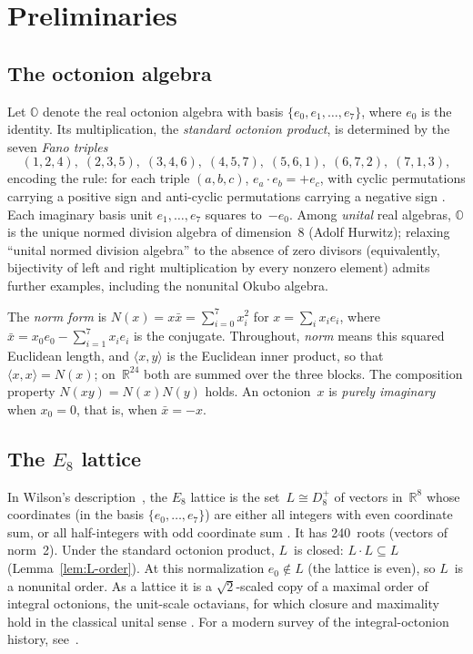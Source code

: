 \documentclass[twoside,english]{paper}
\numberwithin{equation}{section}
\numberwithin{figure}{section}
\theoremstyle{definition}
\theoremstyle{remark}
\newcommand{\OO}{\mathbb{O}}          %
\newcommand{\RR}{\mathbb{R}}
\newcommand{\Nrm}{N}                  %
\begin{document}
\section{Preliminaries}\label{sec:prelim}

\subsection{The octonion algebra}

Let $\OO$ denote the real octonion algebra with basis
$\{e_0, e_1, \ldots, e_7\}$, where $e_0$ is the identity.
Its multiplication, the \emph{standard octonion product}, is
determined by the seven \emph{Fano triples}
\begin{equation}\label{eq:fano}
  (1,2,4),\; (2,3,5),\; (3,4,6),\; (4,5,7),\; (5,6,1),\;
  (6,7,2),\; (7,1,3),
\end{equation}
encoding the rule: for each triple $(a,b,c)$,
$e_a \cdot e_b = +e_c$, with cyclic permutations carrying a positive
sign and anti-cyclic permutations carrying a negative sign
\cite{Baez2002}.  Each imaginary basis unit $e_1, \ldots, e_7$ squares
to~$-e_0$.  Among
\emph{unital} real algebras, $\OO$ is the unique normed division
algebra of dimension~8 (Adolf Hurwitz); relaxing ``unital normed division
algebra'' to the absence of zero divisors (equivalently, bijectivity of left and
right multiplication by every nonzero element) admits further
examples, including the nonunital Okubo algebra.

The \emph{norm form} is $\Nrm(x) = x \bar{x} = \sum_{i=0}^7 x_i^2$
for $x = \sum_i x_i e_i$, where $\bar{x} = x_0 e_0 - \sum_{i=1}^7
x_i e_i$ is the conjugate.  Throughout, \emph{norm} means this
squared Euclidean length, and $\langle x, y\rangle$ is the Euclidean inner
product, so that $\langle x, x\rangle = \Nrm(x)$; on~$\RR^{24}$ both are
summed over the three blocks.  The composition property
$\Nrm(xy) = \Nrm(x)\Nrm(y)$ holds.  An octonion~$x$ is \emph{purely
imaginary} when $x_0 = 0$, that is, when $\bar x = -x$.

\subsection{The \texorpdfstring{$E_8$}{E8} lattice}

In Wilson's description~\cite{Wilson2009}, the $E_8$ lattice is
the set~$L \cong D_8^+$ of vectors in~$\RR^8$ whose coordinates (in the
basis $\{e_0, \ldots, e_7\}$) are either all integers with even
coordinate sum, or all half-integers with odd coordinate sum
\cite{ConwaySmith2003}.  It has
240~roots (vectors of norm~2).  Under the standard octonion
product, $L$~is closed: $L \cdot L \subseteq L$
(Lemma~\ref{lem:L-order}).  At this normalization $e_0 \notin L$ (the
lattice is even), so $L$~is a nonunital order.  As a lattice it is a
$\sqrt{2}$-scaled copy of a maximal order of integral octonions, the
unit-scale octavians, for which closure and maximality hold in the
classical unital sense \cite{Coxeter1946, ConwaySmith2003}.  For a
modern survey of the integral-octonion history,
see~\cite{Petersson2018}.
\end{document}

